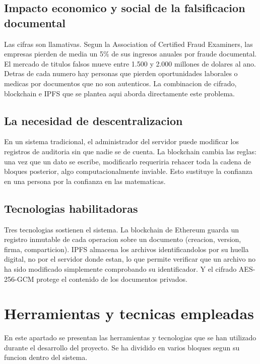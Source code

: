 \documentclass[11pt, a4paper]{article}
\begin{document}
\subsection{Impacto economico y social de la falsificacion documental}

Las cifras son llamativas. Segun la Association of Certified Fraud Examiners, las empresas pierden de media un 5\% de sus ingresos anuales por fraude documental. El mercado de titulos falsos mueve entre 1.500 y 2.000 millones de dolares al ano. Detras de cada numero hay personas que pierden oportunidades laborales o medicas por documentos que no son autenticos. La combinacion de cifrado, blockchain e IPFS que se plantea aqui aborda directamente este problema.

\subsection{La necesidad de descentralizacion}

En un sistema tradicional, el administrador del servidor puede modificar los registros de auditoria sin que nadie se de cuenta. La blockchain cambia las reglas: una vez que un dato se escribe, modificarlo requeriria rehacer toda la cadena de bloques posterior, algo computacionalmente inviable. Esto sustituye la confianza en una persona por la confianza en las matematicas.

\subsection{Tecnologias habilitadoras}

Tres tecnologias sostienen el sistema. La blockchain de Ethereum guarda un registro inmutable de cada operacion sobre un documento (creacion, version, firma, comparticion). IPFS almacena los archivos identificandolos por su huella digital, no por el servidor donde estan, lo que permite verificar que un archivo no ha sido modificado simplemente comprobando su identificador. Y el cifrado AES-256-GCM protege el contenido de los documentos privados.

\section{Herramientas y tecnicas empleadas}

En este apartado se presentan las herramientas y tecnologias que se han utilizado durante el desarrollo del proyecto. Se ha dividido en varios bloques segun su funcion dentro del sistema.
\end{document}
